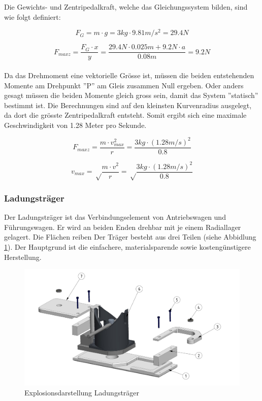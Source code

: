 \documentclass[../../main.tex]{subfiles}
\begin{document}
    Die Gewichts- und Zentripedalkraft, welche das Gleichungssystem bilden, sind wie folgt definiert:

    $$F_{G}=m \cdot g=3kg \cdot 9.81m/s^2=29.4N$$

    $$F_{max z}=\frac{F_{G} \cdot x}{y}=\frac{29.4N \cdot 0.025m+9.2N \cdot a}{0.08m}=9.2N$$
    \\
    Da das Drehmoment eine vektorielle Grösse ist, müssen die beiden entstehenden Momente am Drehpunkt ''P'' am Gleis zusammen Null ergeben. Oder anders gesagt müssen die beiden Momente gleich gross sein, damit das System ''statisch'' bestimmt ist. Die Berechnungen sind auf den kleinsten Kurvenradius ausgelegt, da dort die grösste Zentripedalkraft entsteht. Somit ergibt sich eine maximale Geschwindigkeit von 1.28 Meter pro Sekunde.

    $$F_{max z}=\frac{m \cdot v_{max}^2}{r}=\frac{3kg \cdot (1.28m/s)^2}{0.8}$$

    $$v_{max}=\sqrt\frac{m \cdot v^2}{r}=\sqrt\frac{3kg \cdot (1.28m/s)^2}{0.8}$$

        \pagebreak
    \subsubsection{Ladungsträger}
    Der Ladungsträger ist das Verbindungselement von Antriebswagen und Führungswagen. Er wird an beiden Enden drehbar mit je einem Radiallager gelagert. Die Flächen reiben Der Träger besteht aus drei Teilen (siehe Abbidlung \ref{fig:expl_ladungstraeger}). Der Hauptgrund ist die einfachere, materialsparende sowie kostengünstigere Herstellung.\\

    \begin{figure}[H] %
        \centering
        \includegraphics[width=1\textwidth]{ladungstraeger.png}
        \caption{Explosionsdarstellung Ladungsträger}
        \label{fig:expl_ladungstraeger}
    \end{figure}
\end{document}
